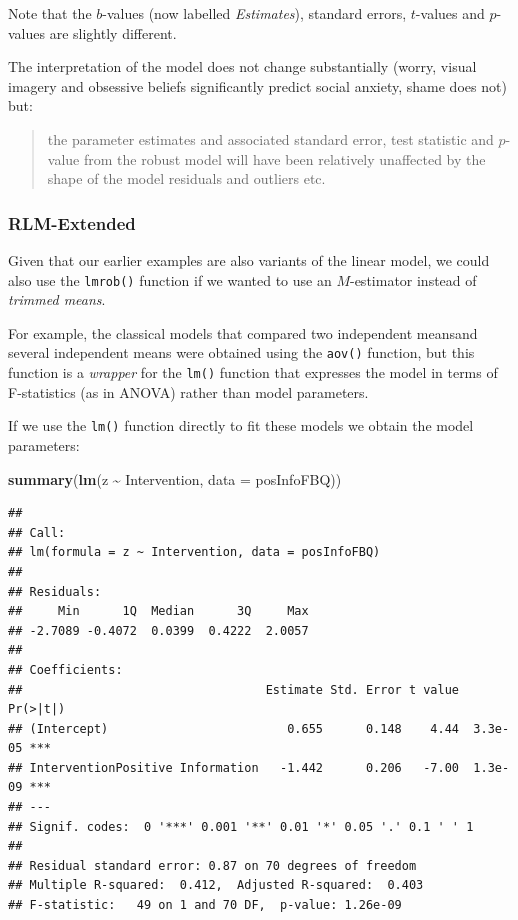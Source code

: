 \documentclass[
]{article}
\newenvironment{Shaded}{\begin{snugshade}}{\end{snugshade}}
\newcommand{\AttributeTok}[1]{\textcolor[rgb]{0.13,0.29,0.53}{#1}}
\newcommand{\FunctionTok}[1]{\textcolor[rgb]{0.13,0.29,0.53}{\textbf{#1}}}
\newcommand{\NormalTok}[1]{#1}
\newcommand{\SpecialCharTok}[1]{\textcolor[rgb]{0.81,0.36,0.00}{\textbf{#1}}}
\begin{document}
Note that the \(b\)-values (now labelled \emph{Estimates}), standard errors, \(t\)-values and \(p\)-values are slightly different.

The interpretation of the model does not change substantially (worry, visual imagery and obsessive beliefs significantly predict social anxiety, shame does not) but:

\begin{quote}
the parameter estimates and associated standard error, test statistic and \(p\)-value from the robust model will have been relatively unaffected by the shape of the model residuals and outliers etc.
\end{quote}

\subsubsection*{RLM-Extended}\label{rlm-extended}

Given that our earlier examples are also variants of the linear model, we could also use the \texttt{lmrob()} function if we wanted to use an \(M\)-estimator instead of \emph{trimmed means}.

For example, the classical models that compared two independent meansand several independent means were obtained using the \texttt{aov()} function, but this function is a \emph{wrapper} for the \texttt{lm()} function that expresses the model in terms of F-statistics (as in ANOVA) rather than model parameters.

If we use the \texttt{lm()} function directly to fit these models we obtain the model parameters:

\begin{Shaded}
\begin{Highlighting}[]
    \FunctionTok{summary}\NormalTok{(}\FunctionTok{lm}\NormalTok{(z }\SpecialCharTok{\textasciitilde{}}\NormalTok{ Intervention, }\AttributeTok{data =}\NormalTok{ posInfoFBQ))}
\end{Highlighting}
\end{Shaded}

\begin{verbatim}
## 
## Call:
## lm(formula = z ~ Intervention, data = posInfoFBQ)
## 
## Residuals:
##     Min      1Q  Median      3Q     Max 
## -2.7089 -0.4072  0.0399  0.4222  2.0057 
## 
## Coefficients:
##                                  Estimate Std. Error t value Pr(>|t|)    
## (Intercept)                         0.655      0.148    4.44  3.3e-05 ***
## InterventionPositive Information   -1.442      0.206   -7.00  1.3e-09 ***
## ---
## Signif. codes:  0 '***' 0.001 '**' 0.01 '*' 0.05 '.' 0.1 ' ' 1
## 
## Residual standard error: 0.87 on 70 degrees of freedom
## Multiple R-squared:  0.412,  Adjusted R-squared:  0.403 
## F-statistic:   49 on 1 and 70 DF,  p-value: 1.26e-09
\end{verbatim}
\end{document}
